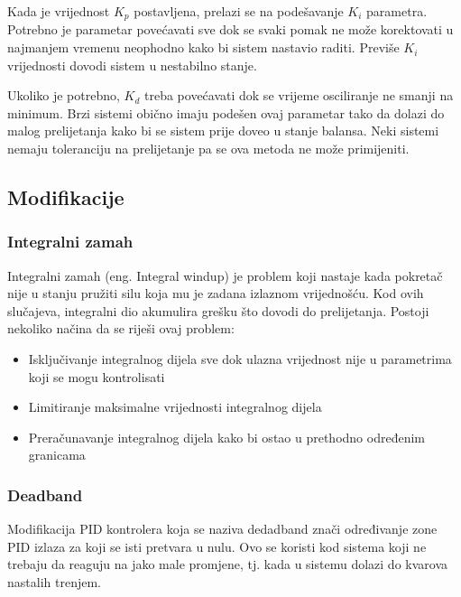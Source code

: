 \documentclass[../Document.tex]{subfiles}
\begin{document}

\noindent Kada je vrijednost $K_p$ postavljena, prelazi se na podešavanje $K_i$ parametra. Potrebno je parametar povećavati sve dok se svaki pomak ne može korektovati u najmanjem vremenu neophodno kako bi sistem nastavio raditi. Previše $K_i$ vrijednosti dovodi sistem u nestabilno stanje\cite{pidtuning}.


\noindent Ukoliko je potrebno, $K_d$ treba povećavati dok se vrijeme osciliranje ne smanji na minimum. Brzi sistemi obično imaju podešen ovaj parametar tako da dolazi do malog prelijetanja kako bi se sistem prije doveo u stanje balansa. Neki sistemi nemaju toleranciju na prelijetanje pa se ova metoda ne može primijeniti\cite{pidtuning}.


\subsection{Modifikacije}

\subsubsection{Integralni zamah}
Integralni zamah (eng. Integral windup) je problem koji nastaje kada pokretač nije u stanju pružiti silu koja mu je zadana izlaznom vrijednošću. Kod ovih slučajeva, integralni dio akumulira grešku što dovodi do prelijetanja. Postoji nekoliko načina da se riješi ovaj problem:

\begin{itemize}
    \item Isključivanje integralnog dijela sve dok ulazna vrijednost nije u parametrima koji se mogu kontrolisati
    \item Limitiranje maksimalne vrijednosti integralnog dijela
    \item Preračunavanje integralnog dijela kako bi ostao u prethodno određenim granicama
\end{itemize}

\subsubsection{Deadband}
Modifikacija PID kontrolera koja se naziva dedadband znači određivanje zone PID izlaza za koji se isti pretvara u nulu. Ovo se koristi kod sistema koji ne trebaju da reaguju na jako male promjene, tj. kada u sistemu dolazi do kvarova nastalih trenjem.
\end{document}
